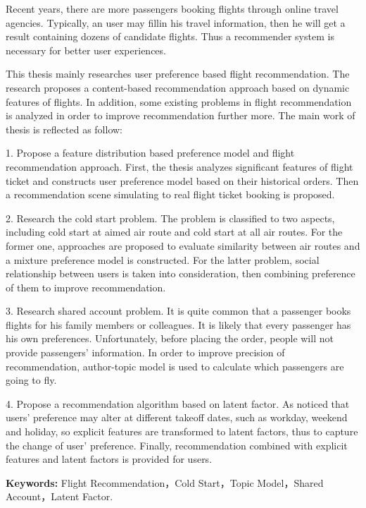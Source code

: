 \begin{englishabstract}
Recent years, there are more passengers booking flights through online travel agencies. Typically, an user may fillin his travel information, then he will get a result containing dozens of candidate flights. Thus a recommender system is necessary for better user experiences.

This thesis mainly researches user preference based flight recommendation. The research proposes a content-based recommendation approach based on dynamic features of flights. In addition, some existing problems in flight recommendation is analyzed in order to improve recommendation further more. The main work of thesis is reflected as follow:

1. Propose a feature distribution based preference model and flight recommendation approach. First, the thesis analyzes significant features of flight ticket and constructs user preference model based on their historical orders. Then a recommendation scene simulating to real flight ticket booking is proposed.

2. Research the cold start problem. The problem is classified to two aspects, including cold start at aimed air route and cold start at all air routes. For the former one, approaches are proposed to evaluate similarity between air routes and a mixture preference model is constructed. For the latter problem, social relationship between users is taken into consideration, then combining preference of them to improve recommendation.

3. Research shared account problem. It is quite common that a passenger books flights for his family members or colleagues. It is likely that every passenger has his own preferences. Unfortunately, before placing the order, people will not provide passengers' information. In order to improve precision of  recommendation, author-topic model is used to calculate which passengers are going to fly.

4. Propose a recommendation algorithm based on latent factor. As noticed that users' preference may alter at different takeoff dates, such as workday, weekend and holiday, so explicit features are transformed to latent factors, thus to capture the change of user' preference. Finally, recommendation combined with explicit features and latent factors is provided for users.


\textbf{Keywords:} Flight Recommendation，Cold Start，Topic Model，Shared Account，Latent Factor.
\end{englishabstract}


